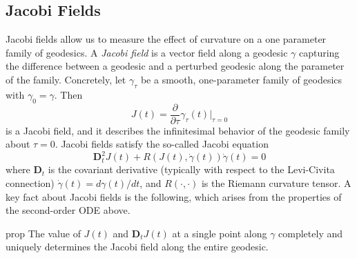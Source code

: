 \documentclass{article}
\begin{document}
\subsection{Jacobi Fields}
Jacobi fields allow us to measure the effect of curvature on a one parameter family of geodesics. A \textit{Jacobi field} is a vector field along a geodesic $\gamma$ capturing the difference between a geodesic and a perturbed geodesic along the parameter of the family. Concretely, let $\gamma_{\tau}$ be a smooth, one-parameter family of geodesics with $\gamma_0 = \gamma$. Then
\begin{equation}
    J(t) = \frac{\partial}{\partial \tau}\gamma_{\tau}(t)\bigg|_{\tau = 0}
\end{equation}
is a Jacobi field, and it describes the infinitesimal behavior of the geodesic family about $\tau = 0$. Jacobi fields satisfy the so-called Jacobi equation
\begin{equation}
    \mathbf{D}_t^2J(t) + R(J(t), \dot{\gamma}(t))\dot{\gamma}(t) = 0
\end{equation}
where $\mathbf{D}_t$ is the covariant derivative (typically with respect to the Levi-Civita connection) $\dot{\gamma}(t) = d\gamma(t)/dt$, and $R(\cdot, \cdot)$ is the Riemann curvature tensor. A key fact about Jacobi fields is the following, which arises from the properties of the second-order ODE above. 

\begin{restatable}{prop}{}
The value of $J(t)$ and $\mathbf{D}_tJ(t)$ at a single point along $\gamma$ completely and uniquely determines the Jacobi field along the entire geodesic.    
\end{restatable}
\end{document}
